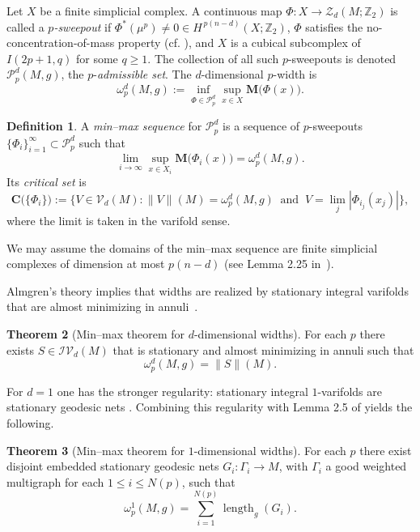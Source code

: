 \documentclass[12pt,english]{article}
\theoremstyle{definition}
\newtheorem{theorem}{Theorem}[section]
\newtheorem{definition}[theorem]{Definition}
\begin{document}
Let \(X\) be a finite simplicial complex. A continuous map \(\Phi\colon X\to\mathcal{Z}_d(M;\mathbb{Z}_2)\) is called a \textit{\(p\)-sweepout}
if \(\Phi^*(\mu^p)\neq 0\in H^{\,p(n-d)}(X;\mathbb{Z}_2)\), \(\Phi\) satisfies the
no-concentration-of-mass property (cf. \cite{LMN,MN1}), and \(X\) is a cubical subcomplex of \(I(2p+1,q)\) for some \(q\ge1\).
The collection of all such \(p\)-sweepouts is denoted \(\mathcal{P}^d_p(M,g)\), the \(p\)-\textit{admissible set}. The \(d\)-dimensional \(p\)-width is
\[
\omega_p^d(M,g):=\inf_{\Phi\in\mathcal{P}^d_p}\sup_{x\in X}\mathbf M\bigl(\Phi(x)\bigr).
\]

\begin{definition}
A \textit{min--max sequence} for \(\mathcal{P}^d_p\) is a sequence of \(p\)-sweepouts \(\{\Phi_i\}_{i=1}^\infty\subset\mathcal{P}^d_p\)
such that
\[
\lim_{i\to\infty}\sup_{x\in X_i}\mathbf M\bigl(\Phi_i(x)\bigr)=\omega_p^d(M,g).
\]
Its \textit{critical set} is
\[
\mathbf C\bigl(\{\Phi_i\}\bigr)
:=\Big\{V\in\mathcal V_d(M): \|V\|(M)=\omega_p^d(M,g)\ \text{ and }\ V=\lim_j|\Phi_{i_j}(x_j)|\Big\},
\]
where the limit is taken in the varifold sense.
\end{definition}
We may assume the domains of the min--max sequence are finite simplicial complexes of dimension at most $p(n-d)$ (see Lemma 2.25 in~\cite{Staffa_Weyl}).

Almgren's theory implies that widths are realized by stationary integral varifolds that are almost minimizing in annuli~\cite{A1, A2, MarquesNevesTop}.

\begin{theorem}[Min--max theorem for \(d\)-dimensional widths]
\label{thm:minmax}
For each \(p\) there exists $S \in \mathcal{IV}_d(M)$ that is stationary and almost minimizing in annuli such that
\[
\omega_p^d(M,g)= \| S \|(M).
\]
\end{theorem}

For $d = 1$ one has the
stronger regularity: stationary integral \(1\)-varifolds are stationary geodesic nets \cite{A1,A2,CaCa,NR,Pi2,Pi1}. Combining this regularity with Lemma 2.5 of \cite{LiokumovichStaffa} yields the following.

\begin{theorem}[Min--max theorem for \(1\)-dimensional widths]
\label{thm:1d-minmax}
For each \(p\) there exist disjoint embedded stationary geodesic nets \(G_i:\Gamma_i\to M\), with $\Gamma_i$ a good weighted multigraph for each $1 \leq i \leq N(p)$, such that
\[
\omega_p^1(M,g)= \sum_{i=1}^{N(p)} \operatorname{length}_g(G_i).
\]
\end{theorem}
\end{document}
